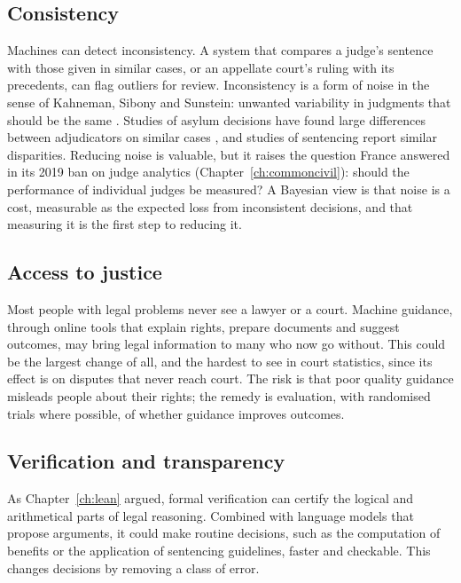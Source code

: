 \subsection{Consistency}

Machines can detect inconsistency. A system that compares a judge's sentence with those given in similar cases, or an appellate court's ruling with its precedents, can flag outliers for review. Inconsistency is a form of noise in the sense of Kahneman, Sibony and Sunstein: unwanted variability in judgments that should be the same \citep{kahneman2021}. Studies of asylum decisions have found large differences between adjudicators on similar cases \citep{ramji2007}, and studies of sentencing report similar disparities. Reducing noise is valuable, but it raises the question France answered in its 2019 ban on judge analytics (Chapter~\ref{ch:commoncivil}): should the performance of individual judges be measured? A Bayesian view is that noise is a cost, measurable as the expected loss from inconsistent decisions, and that measuring it is the first step to reducing it.

\subsection{Access to justice}

Most people with legal problems never see a lawyer or a court. Machine guidance, through online tools that explain rights, prepare documents and suggest outcomes, may bring legal information to many who now go without. This could be the largest change of all, and the hardest to see in court statistics, since its effect is on disputes that never reach court. The risk is that poor quality guidance misleads people about their rights; the remedy is evaluation, with randomised trials where possible, of whether guidance improves outcomes.

\subsection{Verification and transparency}

As Chapter~\ref{ch:lean} argued, formal verification can certify the logical and arithmetical parts of legal reasoning. Combined with language models that propose arguments, it could make routine decisions, such as the computation of benefits or the application of sentencing guidelines, faster and checkable. This changes decisions by removing a class of error.

